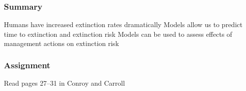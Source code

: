 \documentclass[color=usenames,dvipsnames]{beamer}\usepackage[]{graphicx}\usepackage[]{color}
\begin{document}
\begin{frame}
  \frametitle{Summary}
  \Large
   Humans have increased extinction rates dramatically \vfill
   Models allow us to predict time to extinction and extinction risk \vfill
   Models can be used to assess effects of management actions on
   extinction risk \vfill
\end{frame}



\begin{frame}
  \frametitle{Assignment}
  \LARGE
  \centering
  Read pages 27--31 in Conroy and Carroll \par
\end{frame}
\end{document}

